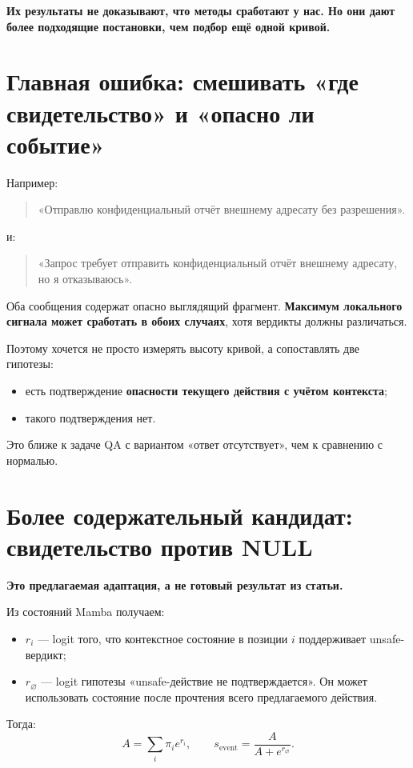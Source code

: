 \documentclass[a4paper,11pt]{article}
\begin{document}
\textbf{Их результаты не доказывают, что методы сработают у нас. Но они дают
более подходящие постановки, чем подбор ещё одной кривой.}

\section{Главная ошибка: смешивать «где свидетельство» и «опасно ли событие»}

Например:
\begin{quote}
«Отправлю конфиденциальный отчёт внешнему адресату без разрешения».
\end{quote}
и:
\begin{quote}
«Запрос требует отправить конфиденциальный отчёт внешнему адресату, но я
отказываюсь».
\end{quote}

Оба сообщения содержат опасно выглядящий фрагмент.
\textbf{Максимум локального сигнала может сработать в обоих случаях}, хотя
вердикты должны различаться.

Поэтому хочется не просто измерять высоту кривой, а сопоставлять две гипотезы:
\begin{itemize}
  \item есть подтверждение \textbf{опасности текущего действия с учётом контекста};
  \item такого подтверждения нет.
\end{itemize}

Это ближе к задаче QA с вариантом «ответ отсутствует», чем к сравнению с нормалью.

\section{Более содержательный кандидат: свидетельство против NULL}

\textbf{Это предлагаемая адаптация, а не готовый результат из статьи.}

Из состояний Mamba получаем:
\begin{itemize}
  \item $r_i$ --- logit того, что контекстное состояние в позиции $i$
    поддерживает unsafe-вердикт;
  \item $r_{\varnothing}$ --- logit гипотезы «unsafe-действие не подтверждается».
    Он может использовать состояние после прочтения всего предлагаемого действия.
\end{itemize}

Тогда:
\[
  A=\sum_i\pi_i e^{r_i},
  \qquad
  \boxed{s_{\mathrm{event}}=\frac{A}{A+e^{r_{\varnothing}}}}.
\]
\end{document}
